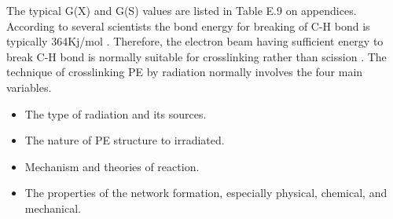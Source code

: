 \documentclass[12pt]{report}
\begin{document}
The typical G(X) and G(S) values are listed in Table E.9 on appendices. \\

According to several scientists the bond energy for breaking of C-H bond is typically 364Kj/mol \cite{meola2005cross}. Therefore, the electron beam having sufficient energy to break C-H bond is normally suitable for crosslinking rather than scission \cite{meola2005cross}. The technique of crosslinking PE by radiation normally involves the four main variables. 

\begin{itemize}
    \item The type of radiation and its sources.
    \item The nature of PE structure to irradiated.
    \item Mechanism and theories of reaction.
    \item The properties of the network formation, especially physical, chemical, and mechanical. 
\end{itemize}
\end{document}
